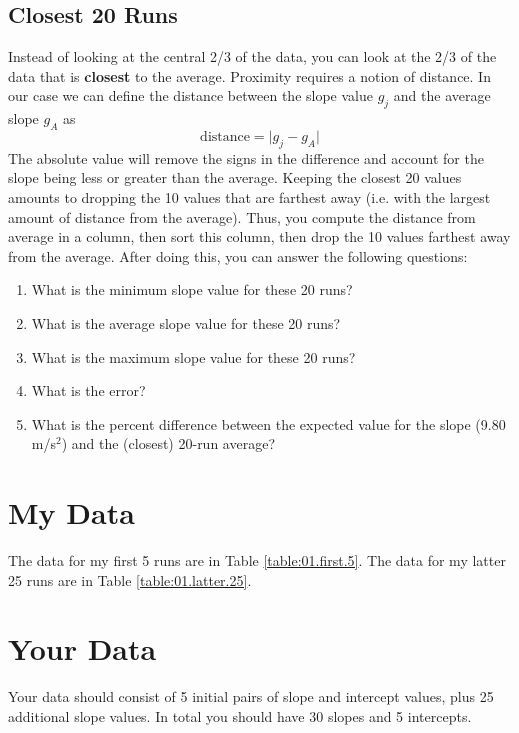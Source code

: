 \subsection{Closest 20 Runs} \label{sec:01.closest.20}
Instead of looking at the central 2/3 of the data, you can look at the 2/3 of the data that is \textbf{closest} to the average. Proximity requires a notion of distance. In our case we can define the distance between the slope value $g_{j}$ and the average slope $g_{A}$ as
\begin{equation}
    \text{distance} = \vert g_{j} - g_{A} \vert
\end{equation}
The absolute value will remove the signs in the difference and account for the slope being less or greater than the average. Keeping the closest 20 values amounts to dropping the 10 values that are farthest away (i.e. with the largest amount of distance from the average). Thus, you compute the distance from average in a column, then sort this column, then drop the 10 values farthest away from the average. After doing this, you can answer the following questions:
\begin{enumerate}
    \item What is the minimum slope value for these 20 runs?
    \item What is the average slope value for these 20 runs?
    \item What is the maximum slope value for these 20 runs?
    \item What is the error?
    \item What is the percent difference between the expected value for the slope (9.80 m/s$^{2}$) and the (closest) 20-run average?
\end{enumerate}
\section{My Data}
The data for my first 5 runs are in Table \ref{table:01.first.5}. The data for my latter 25 runs are in Table \ref{table:01.latter.25}.
\section{Your Data}
Your data should consist of 5 initial pairs of slope and intercept values, plus 25 additional slope values. In total you should have 30 slopes and 5 intercepts.
\newpage
